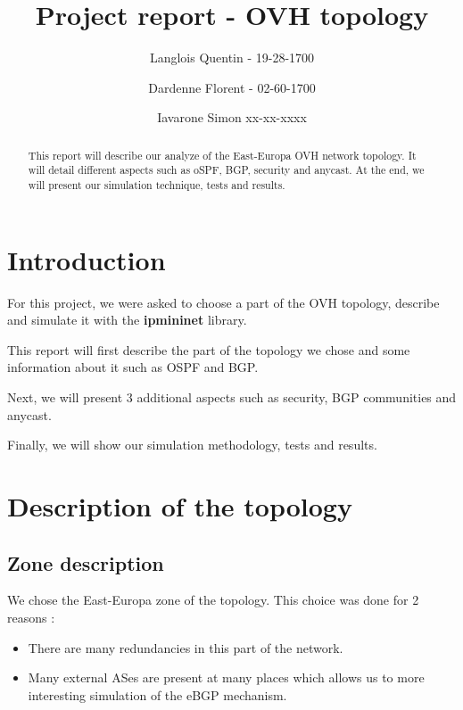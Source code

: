 \documentclass[letter, 9pt, conference]{ieeeconf}
\title{Project report - OVH topology}
\author{Langlois Quentin - 19-28-1700 \and Dardenne Florent - 02-60-1700 \and Iavarone Simon xx-xx-xxxx }
\begin{document}
\maketitle
\thispagestyle{empty}
\pagestyle{empty}


\begin{abstract}

This report will describe our analyze of the East-Europa OVH network topology. It will detail different aspects such as oSPF, BGP, security and anycast. At the end, we will present our simulation technique, tests and results. 

\end{abstract}


\section{Introduction}

For this project, we were asked to choose a part of the OVH topology, describe and simulate it with the \textbf{ipmininet} library. 

This report will first describe the part of the topology we chose and some information about it such as OSPF and BGP. 

Next, we will present 3 additional aspects such as security, BGP communities and anycast. 

Finally, we will show our simulation methodology, tests and results. 

\section{Description of the topology}

\subsection{Zone description}

We chose the East-Europa zone of the topology. This choice was done for 2 reasons : 

\begin{itemize}
    \item There are many redundancies in this part of the network. 
    \item Many external ASes are present at many places which allows us to more interesting simulation of the eBGP mechanism. 
\end{itemize}
\end{document}
